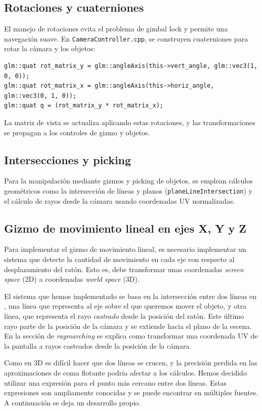 \subsection{Rotaciones y cuaterniones}

El manejo de rotaciones evita el problema de gimbal lock y permite una
navegación suave. En \texttt{CameraController.cpp}, se construyen cuaterniones
para rotar la cámara y los objetos:
\begin{verbatim}
glm::quat rot_matrix_y = glm::angleAxis(this->vert_angle, glm::vec3(1, 0, 0));
glm::quat rot_matrix_x = glm::angleAxis(this->horiz_angle, glm::vec3(0, 1, 0));
glm::quat q = (rot_matrix_y * rot_matrix_x);
\end{verbatim}
La matriz de vista se actualiza aplicando estas rotaciones, y las
transformaciones se propagan a los controles de gizmo y objetos.

\subsection{Intersecciones y picking}

Para la manipulación mediante gizmos y picking de objetos, se emplean cálculos
geométricos como la intersección de líneas y planos
(\texttt{planeLineIntersection}) y el cálculo de rayos desde la cámara usando
coordenadas UV normalizadas.

\subsection{Gizmo de movimiento lineal en ejes X, Y y Z}

Para implementar el gizmo de movimiento lineal, es necesario implementar un sistema que detecte la cantidad de movimiento en cada eje con respecto al desplazamiento del ratón. Esto es, debe transformar unas coordenadas \textit{screen space} (2D) a coordenadas \textit{world space} (3D).

El sistema que hemos implementado se basa en la intersección entre dos líneas en , una línea que representa al eje sobre el que queremos mover el objeto, y otra línea, que representa el rayo \textit{casteado} desde la posición del ratón. Este último rayo parte de la posición de la cámara y se extiende hacia el plano de la escena. En la sección de \textit{raymarching} se explica como transformar una coordenada UV de la pantalla a rayos casteados desde la posición de la cámara.

Como en 3D es difícil hacer que dos líneas se crucen, y la precisión perdida en las aproximaciones de coma flotante podría afectar a los cálculos. Hemos decidido utilizar una expresión para el punto más cercano entre dos líneas. Estas expresiones son ampliamente conocidas y se puede encontrar en múltiples fuentes. A continuación se deja un desarrollo propio.

